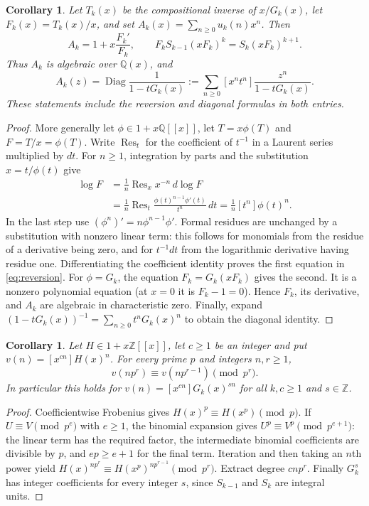 \documentclass[11pt]{article}
\newtheorem{corollary}[theorem]{Corollary}
\begin{document}
\begin{corollary}\label{cor:reversion}
Let $T_k(x)$ be the compositional inverse of $x/G_k(x)$, let
$F_k(x)=T_k(x)/x$, and set $A_k(x)=\sum_{n\geq0}u_k(n)x^n$.
Then
\begin{equation}\label{eq:reversion}
 A_k=1+x\frac{F_k'}{F_k},\qquad
 F_k S_{k-1}(xF_k)^k=S_k(xF_k)^{k+1}.
\end{equation}
Thus $A_k$ is algebraic over $\mathbb Q(x)$, and
\[
 A_k(z)=\operatorname{Diag}\frac{1}{1-tG_k(x)}
 :=\sum_{n\geq0}[x^nt^n]\frac{z^n}{1-tG_k(x)}.
\]
These statements include the reversion and diagonal formulas in both entries.
\end{corollary}
\begin{proof}
More generally let $\phi\in1+x\mathbb Q[[x]]$, let $T=x\phi(T)$ and
$F=T/x=\phi(T)$. Write $\operatorname{Res}_t$ for the coefficient of
$t^{-1}$ in a Laurent series multiplied by $dt$.
For $n\geq1$, integration by parts and the substitution $x=t/\phi(t)$ give
\begin{align*}
 [x^n]\log F
 &=\frac1n\operatorname{Res}_x x^{-n}\,d\log F\\
 &=\frac1n\operatorname{Res}_t
 \frac{\phi(t)^{n-1}\phi'(t)}{t^n}\,dt
 =\frac1n[t^n]\phi(t)^n.
\end{align*}
In the last step use $(\phi^n)'=n\phi^{n-1}\phi'$.
Formal residues are unchanged by a substitution with nonzero linear term:
this follows for monomials from the residue of a derivative being zero,
and for $t^{-1}dt$ from the logarithmic derivative having residue one.
Differentiating the coefficient identity proves the first equation in
\eqref{eq:reversion}. For $\phi=G_k$, the equation $F_k=G_k(xF_k)$
gives the second. It is a nonzero polynomial equation (at $x=0$ it is
$F_k-1=0$). Hence $F_k$, its derivative, and $A_k$ are algebraic in
characteristic zero. Finally, expand $(1-tG_k(x))^{-1}=\sum_{n\geq0}t^nG_k(x)^n$
to obtain the diagonal identity.
\end{proof}

\begin{corollary}\label{cor:gauss}
Let $H\in1+x\mathbb Z[[x]]$, let $c\geq1$ be an integer and put
$v(n)=[x^{cn}]H(x)^n$. For every prime $p$ and integers $n,r\geq1$,
\[
 v(np^r)\equiv v(np^{r-1})\pmod{p^r}.
\]
In particular this holds for
$v(n)=[x^{cn}]G_k(x)^{sn}$ for all $k,c\geq1$ and $s\in\mathbb Z$.
\end{corollary}
\begin{proof}
Coefficientwise Frobenius gives $H(x)^p\equiv H(x^p)\pmod p$.
If $U\equiv V\pmod{p^e}$ with $e\geq1$, the binomial expansion gives
$U^p\equiv V^p\pmod{p^{e+1}}$: the linear term has the required factor,
the intermediate binomial coefficients are divisible by $p$, and
$ep\geq e+1$ for the final term.
Iteration and then taking an $n$th power yield
$H(x)^{np^r}\equiv H(x^p)^{np^{r-1}}\pmod{p^r}$.
Extract degree $cnp^r$. Finally $G_k^s$ has integer coefficients for
every integer $s$, since $S_{k-1}$ and $S_k$ are integral units.
\end{proof}
\end{document}
